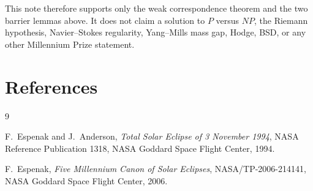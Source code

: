 \documentclass[11pt]{article}
\theoremstyle{definition}
\theoremstyle{remark}
\begin{document}
This note therefore supports only the weak correspondence theorem and the two
barrier lemmas above. It does not claim a solution to \(P\) versus \(NP\), the
Riemann hypothesis, Navier--Stokes regularity, Yang--Mills mass gap, Hodge,
BSD, or any other Millennium Prize statement.

\section*{References}

\begin{thebibliography}{9}

F.~Espenak and J.~Anderson,
\emph{Total Solar Eclipse of 3 November 1994},
NASA Reference Publication 1318, NASA Goddard Space Flight Center, 1994.

F.~Espenak,
\emph{Five Millennium Canon of Solar Eclipses},
NASA/TP-2006-214141, NASA Goddard Space Flight Center, 2006.

\end{thebibliography}
\end{document}
